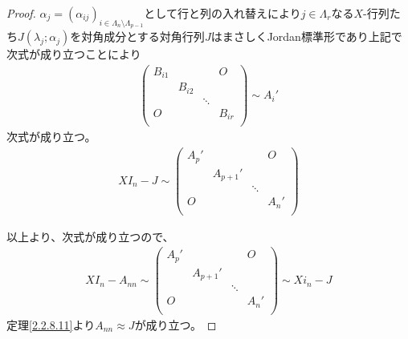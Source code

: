 \documentclass[dvipdfmx]{jsarticle}
\begin{document}
\begin{proof}
$\alpha_{j} = \left( \alpha_{ij} \right)_{i \in \varLambda_{n} \setminus \varLambda_{p - 1}}$として行と列の入れ替えにより$j \in \varLambda_{r}$なる$X$-行列たち$J\left( \lambda_{j};\alpha_{j} \right)$を対角成分とする対角行列$J$はまさしくJordan標準形であり上記で次式が成り立つことにより
\begin{align*}
\begin{pmatrix}
B_{i1} & \  & \  & O \\
\  & B_{i2} & \  & \  \\
\  & \  & \ddots & \  \\
O & \  & \  & B_{ir} \\
\end{pmatrix} \sim A_{i}'
\end{align*}
次式が成り立つ。
\begin{align*}
XI_{n} - J \sim \begin{pmatrix}
A_{p}' & \  & \  & O \\
\  & A_{p + 1}' & \  & \  \\
\  & \  & \ddots & \  \\
O & \  & \  & A_{n}' \\
\end{pmatrix}
\end{align*}\par
以上より、次式が成り立つので、
\begin{align*}
XI_{n} - A_{nn} \sim \begin{pmatrix}
A_{p}' & \  & \  & O \\
\  & A_{p + 1}' & \  & \  \\
\  & \  & \ddots & \  \\
O & \  & \  & A_{n}' \\
\end{pmatrix} \sim Xi_{n} - J
\end{align*}
定理\ref{2.2.8.11}より$A_{nn} \approx J$が成り立つ。
\end{proof}
\end{document}
